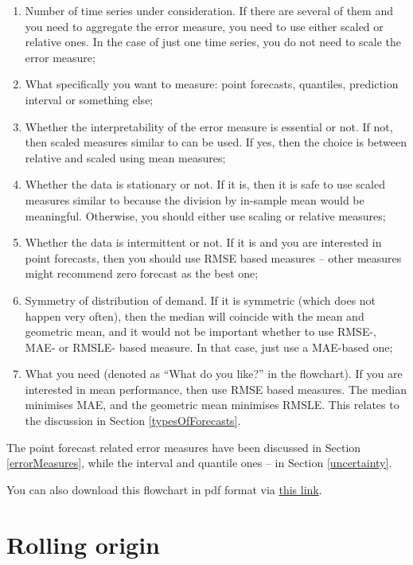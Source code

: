 \documentclass[
]{book}
\providecommand{\tightlist}{%
  \setlength{\itemsep}{0pt}\setlength{\parskip}{0pt}}
\theoremstyle{definition}
\theoremstyle{definition}
\theoremstyle{definition}
\theoremstyle{definition}
\theoremstyle{remark}
\begin{document}
\begin{enumerate}
\def\labelenumi{\arabic{enumi}.}
\tightlist
\item
  Number of time series under consideration. If there are several of them and you need to aggregate the error measure, you need to use either scaled or relative ones. In the case of just one time series, you do not need to scale the error measure;
\item
  What specifically you want to measure: point forecasts, quantiles, prediction interval or something else;
\item
  Whether the interpretability of the error measure is essential or not. If not, then scaled measures similar to \citet{Hyndman2006} can be used. If yes, then the choice is between relative and scaled using mean measures;
\item
  Whether the data is stationary or not. If it is, then it is safe to use scaled measures similar to \citet{Petropoulos2015} because the division by in-sample mean would be meaningful. Otherwise, you should either use \citet{Hyndman2006} scaling or relative measures;
\item
  Whether the data is intermittent or not. If it is and you are interested in point forecasts, then you should use RMSE based measures -- other measures might recommend zero forecast as the best one;
\item
  Symmetry of distribution of demand. If it is symmetric (which does not happen very often), then the median will coincide with the mean and geometric mean, and it would not be important whether to use RMSE-, MAE- or RMSLE- based measure. In that case, just use a MAE-based one;
\item
  What you need (denoted as ``What do you like?'' in the flowchart). If you are interested in mean performance, then use RMSE based measures. The median minimises MAE, and the geometric mean minimises RMSLE. This relates to the discussion in Section \ref{typesOfForecasts}.
\end{enumerate}

The point forecast related error measures have been discussed in Section \ref{errorMeasures}, while the interval and quantile ones -- in Section \ref{uncertainty}.

You can also download this flowchart in pdf format via \href{./images/errorMeasuresFlowChart-v2.pdf}{this link}.

\hypertarget{rollingOrigin}{%
\section{Rolling origin}\label{rollingOrigin}}
\end{document}
